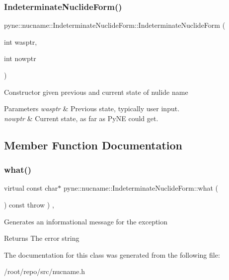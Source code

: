 \subsubsection{\texorpdfstring{Indeterminate\+Nuclide\+Form()}{IndeterminateNuclideForm()}\hspace{0.1cm}{\footnotesize\ttfamily [4/4]}}
{\footnotesize\ttfamily pyne\+::nucname\+::\+Indeterminate\+Nuclide\+Form\+::\+Indeterminate\+Nuclide\+Form (\begin{DoxyParamCaption}\item[{int}]{wasptr,  }\item[{int}]{nowptr }\end{DoxyParamCaption})\hspace{0.3cm}{\ttfamily [inline]}}

Constructor given previous and current state of nulide name 
\begin{DoxyParams}{Parameters}
{\em wasptr} & Previous state, typically user input. \\
\hline
{\em nowptr} & Current state, as far as Py\+NE could get. \\
\hline
\end{DoxyParams}


\subsection{Member Function Documentation}
\mbox{\label{classpyne_1_1nucname_1_1_indeterminate_nuclide_form_a28a16b4bf2b6ba6184758f8f469fb90b}} 
\subsubsection{\texorpdfstring{what()}{what()}}
{\footnotesize\ttfamily virtual const char$\ast$ pyne\+::nucname\+::\+Indeterminate\+Nuclide\+Form\+::what (\begin{DoxyParamCaption}{ }\end{DoxyParamCaption}) const throw  ) \hspace{0.3cm}{\ttfamily [inline]}, {\ttfamily [virtual]}}

Generates an informational message for the exception \begin{DoxyReturn}{Returns}
The error string 
\end{DoxyReturn}


The documentation for this class was generated from the following file\+:\begin{DoxyCompactItemize}
\item 
/root/repo/src/nucname.\+h\end{DoxyCompactItemize}
